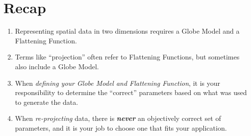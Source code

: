 \documentclass[11pt]{article}
\begin{document}
\section{Recap}\label{recap}
\begin{enumerate}
	\item Representing spatial data in two dimensions requires a Globe Model and a Flattening Function.
	\item Terms like ``projection'' often refer to Flattening Functions, but sometimes also include a Globe Model.
	\item When \emph{defining your Globe Model and Flattening Function}, it is your responsibility to determine the ``correct'' parameters based on what was used to generate the data.
	\item When \emph{re-projecting} data, there is \textbf{\emph{never}} an objectively correct set of parameters, and it is your job to choose one that fits your application.
\end{enumerate}
\end{document}
